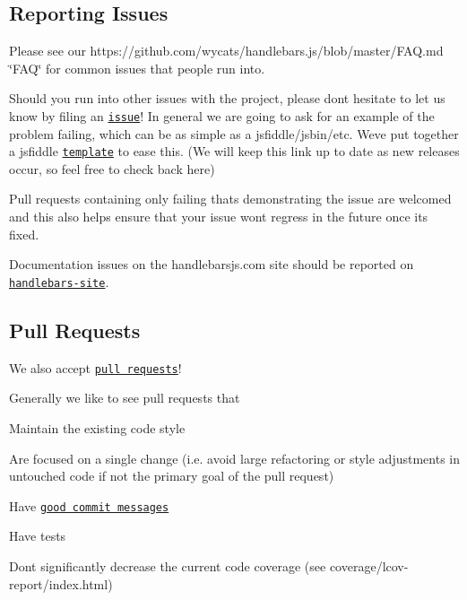 \subsection*{Reporting Issues}

Please see our https\+://github.com/wycats/handlebars.\+js/blob/master/\+F\+A\+Q.md \char`\"{}\+F\+A\+Q\char`\"{} for common issues that people run into.

Should you run into other issues with the project, please don\textquotesingle{}t hesitate to let us know by filing an \href{https://github.com/wycats/handlebars.js/issues/new}{\tt issue}! In general we are going to ask for an example of the problem failing, which can be as simple as a jsfiddle/jsbin/etc. We\textquotesingle{}ve put together a jsfiddle \href{http://jsfiddle.net/9D88g/46/}{\tt template} to ease this. (We will keep this link up to date as new releases occur, so feel free to check back here)

Pull requests containing only failing thats demonstrating the issue are welcomed and this also helps ensure that your issue won\textquotesingle{}t regress in the future once it\textquotesingle{}s fixed.

Documentation issues on the handlebarsjs.\+com site should be reported on \href{https://github.com/wycats/handlebars-site}{\tt handlebars-\/site}.

\subsection*{Pull Requests}

We also accept \href{https://github.com/wycats/handlebars.js/pull/new/master}{\tt pull requests}!

Generally we like to see pull requests that
\begin{DoxyItemize}
\item Maintain the existing code style
\item Are focused on a single change (i.\+e. avoid large refactoring or style adjustments in untouched code if not the primary goal of the pull request)
\item Have \href{http://tbaggery.com/2008/04/19/a-note-about-git-commit-messages.html}{\tt good commit messages}
\item Have tests
\item Don\textquotesingle{}t significantly decrease the current code coverage (see coverage/lcov-\/report/index.\+html)
\end{DoxyItemize}

